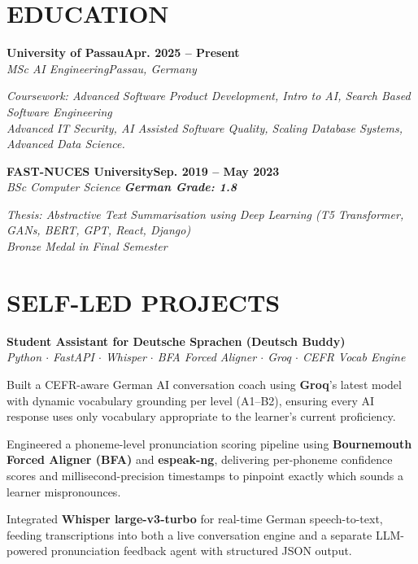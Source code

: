\documentclass[letterpaper,10pt]{article}
\newcommand{\heading}[2]{
  \hspace{10pt}#1\hfill#2\\
}
\newcommand{\headingBf}[2]{
  \heading{\textbf{#1}}{\textbf{#2}}
}
\newcommand{\headingIt}[2]{
  \heading{\textit{#1}}{\textit{#2}}
}
\newenvironment{resume_list}{
  \vspace{-7pt}
  \begin{itemize}[itemsep=-2px, parsep=1pt, leftmargin=30pt]
}{
  \end{itemize}
}
\begin{document}

  \section{EDUCATION}

  \vspace{2pt}

  \headingBf{University of Passau}{Apr. 2025 -- Present}
    \headingIt{MSc AI Engineering}{Passau, Germany}
  \vspace{2pt}
  \heading{\textit{Coursework: Advanced Software Product Development, Intro to AI, Search Based Software Engineering}}{}
  \heading{\textit{Advanced IT Security, AI Assisted Software Quality, Scaling Database Systems, Advanced Data Science.}}{}
  \vspace{3pt}

  \headingBf{FAST-NUCES University}{Sep. 2019 -- May 2023}
  \headingIt{BSc Computer Science \quad \textmd{\textbf{German Grade: 1.8}}}{}
  \vspace{2pt}
  \heading{\textit{Thesis: Abstractive Text Summarisation using Deep Learning (T5 Transformer, GANs, BERT, GPT, React, Django)}}{}
  \heading{\textit{Bronze Medal in Final Semester}}{}



  \section{SELF-LED PROJECTS}

\headingBf{Student Assistant for Deutsche Sprachen (Deutsch Buddy)}{}
  \headingIt{Python $\cdot$ FastAPI $\cdot$ Whisper $\cdot$ BFA Forced Aligner $\cdot$ Groq $\cdot$ CEFR Vocab Engine}{}
  \begin{resume_list}
    \item Built a CEFR-aware German AI conversation coach using \textbf{Groq}'s latest model with dynamic vocabulary grounding per level (A1–B2), ensuring every AI response uses only vocabulary appropriate to the learner's current proficiency.
    \item Engineered a phoneme-level pronunciation scoring pipeline using \textbf{Bournemouth Forced Aligner (BFA)} and \textbf{espeak-ng}, delivering per-phoneme confidence scores and millisecond-precision timestamps to pinpoint exactly which sounds a learner mispronounces.
    \item Integrated \textbf{Whisper large-v3-turbo} for real-time German speech-to-text, feeding transcriptions into both a live conversation engine and a separate LLM-powered pronunciation feedback agent with structured JSON output.
    \vspace{1pt}
  \end{resume_list}
\end{document}
